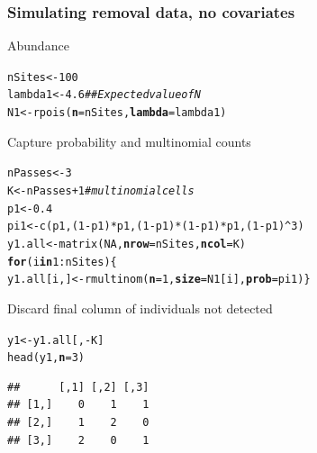 \documentclass[color=usenames,dvipsnames]{beamer}\usepackage[]{graphicx}\usepackage[]{xcolor}
\makeatletter
\newcommand{\hlnum}[1]{\textcolor[rgb]{0.69,0.494,0}{#1}}%
\newcommand{\hlcom}[1]{\textcolor[rgb]{0.514,0.506,0.514}{\textit{#1}}}%
\newcommand{\hlopt}[1]{\textcolor[rgb]{0,0,0}{#1}}%
\newcommand{\hlstd}[1]{\textcolor[rgb]{0,0,0}{#1}}%
\newcommand{\hlkwa}[1]{\textcolor[rgb]{0,0,0}{\textbf{#1}}}%
\newcommand{\hlkwb}[1]{\textcolor[rgb]{0,0.341,0.682}{#1}}%
\newcommand{\hlkwc}[1]{\textcolor[rgb]{0,0,0}{\textbf{#1}}}%
\newcommand{\hlkwd}[1]{\textcolor[rgb]{0.004,0.004,0.506}{#1}}%
\newenvironment{kframe}{%
 \def\at@end@of@kframe{}%
 \ifinner\ifhmode%
  \def\at@end@of@kframe{\end{minipage}}%
  \begin{minipage}{\columnwidth}%
 \fi\fi%
 \def\FrameCommand##1{\hskip\@totalleftmargin \hskip-\fboxsep
 \colorbox{shadecolor}{##1}\hskip-\fboxsep
     \hskip-\linewidth \hskip-\@totalleftmargin \hskip\columnwidth}%
 \MakeFramed {\advance\hsize-\width
   \@totalleftmargin\z@ \linewidth\hsize
   \@setminipage}}%
 {\par\unskip\endMakeFramed%
 \at@end@of@kframe}
\newenvironment{knitrout}{}{} %
\makeatother
\begin{document}
\begin{frame}[fragile]
  \frametitle{Simulating removal data, no covariates}
  \small
  Abundance
\begin{knitrout}\scriptsize
{}\color{fgcolor}\begin{kframe}
\begin{alltt}
\hlstd{nSites} \hlkwb{<-} \hlnum{100}
\hlstd{lambda1} \hlkwb{<-} \hlnum{4.6}  \hlcom{## Expected value of N}
\hlstd{N1} \hlkwb{<-} \hlkwd{rpois}\hlstd{(}\hlkwc{n}\hlstd{=nSites,} \hlkwc{lambda}\hlstd{=lambda1)}
\end{alltt}
\end{kframe}
\end{knitrout}
  \pause
  \vfill
  Capture probability and multinomial counts%
\begin{knitrout}\scriptsize
{}\color{fgcolor}\begin{kframe}
\begin{alltt}
\hlstd{nPasses} \hlkwb{<-} \hlnum{3}
\hlstd{K} \hlkwb{<-} \hlstd{nPasses}\hlopt{+}\hlnum{1}  \hlcom{# multinomial cells}
\hlstd{p1} \hlkwb{<-} \hlnum{0.4}
\hlstd{pi1} \hlkwb{<-} \hlkwd{c}\hlstd{(p1, (}\hlnum{1}\hlopt{-}\hlstd{p1)}\hlopt{*}\hlstd{p1, (}\hlnum{1}\hlopt{-}\hlstd{p1)}\hlopt{*}\hlstd{(}\hlnum{1}\hlopt{-}\hlstd{p1)}\hlopt{*}\hlstd{p1, (}\hlnum{1}\hlopt{-}\hlstd{p1)}\hlopt{^}\hlnum{3}\hlstd{)}
\hlstd{y1.all} \hlkwb{<-} \hlkwd{matrix}\hlstd{(}\hlnum{NA}\hlstd{,} \hlkwc{nrow}\hlstd{=nSites,} \hlkwc{ncol}\hlstd{=K)}
\hlkwa{for}\hlstd{(i} \hlkwa{in} \hlnum{1}\hlopt{:}\hlstd{nSites) \{}
    \hlstd{y1.all[i,]} \hlkwb{<-} \hlkwd{rmultinom}\hlstd{(}\hlkwc{n}\hlstd{=}\hlnum{1}\hlstd{,} \hlkwc{size}\hlstd{=N1[i],} \hlkwc{prob}\hlstd{=pi1)    \}}
\end{alltt}
\end{kframe}
\end{knitrout}
  \pause
  \vfill
  Discard final column of individuals not detected
\begin{knitrout}\scriptsize
{}\color{fgcolor}\begin{kframe}
\begin{alltt}
\hlstd{y1} \hlkwb{<-} \hlstd{y1.all[,}\hlopt{-}\hlstd{K]}
\hlkwd{head}\hlstd{(y1,} \hlkwc{n}\hlstd{=}\hlnum{3}\hlstd{)}
\end{alltt}
\begin{verbatim}
##      [,1] [,2] [,3]
## [1,]    0    1    1
## [2,]    1    2    0
## [3,]    2    0    1
\end{verbatim}
\end{kframe}
\end{knitrout}
\end{frame}
\end{document}
